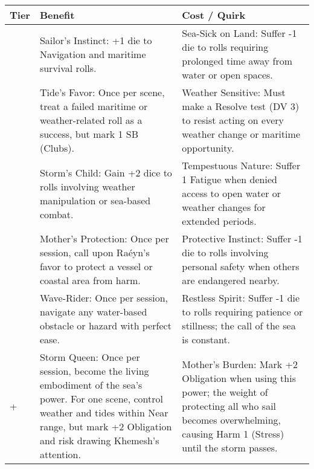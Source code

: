 \begin{longtable}{>{\raggedright\arraybackslash}p{1cm} p{5cm} p{5cm}}
\toprule
\textbf{Tier} & \textbf{Benefit} & \textbf{Cost / Quirk} \\
\midrule
1 & Sailor's Instinct: +1 die to Navigation and maritime survival rolls. & Sea-Sick on Land: Suffer -1 die to rolls requiring prolonged time away from water or open spaces. \\
\midrule
2 & Tide's Favor: Once per scene, treat a failed maritime or weather-related roll as a success, but mark 1 SB (Clubs). & Weather Sensitive: Must make a Resolve test (DV 3) to resist acting on every weather change or maritime opportunity. \\
\midrule
3 & Storm's Child: Gain +2 dice to rolls involving weather manipulation or sea-based combat. & Tempestuous Nature: Suffer 1 Fatigue when denied access to open water or weather changes for extended periods. \\
\midrule
4 & Mother's Protection: Once per session, call upon Raéyn's favor to protect a vessel or coastal area from harm. & Protective Instinct: Suffer -1 die to rolls involving personal safety when others are endangered nearby. \\
\midrule
5 & Wave-Rider: Once per session, navigate any water-based obstacle or hazard with perfect ease. & Restless Spirit: Suffer -1 die to rolls requiring patience or stillness; the call of the sea is constant. \\
\midrule
6+ & Storm Queen: Once per session, become the living embodiment of the sea's power. For one scene, control weather and tides within Near range, but mark +2 Obligation and risk drawing Khemesh's attention. & Mother's Burden: Mark +2 Obligation when using this power; the weight of protecting all who sail becomes overwhelming, causing Harm 1 (Stress) until the storm passes. \\
\bottomrule
\end{longtable}